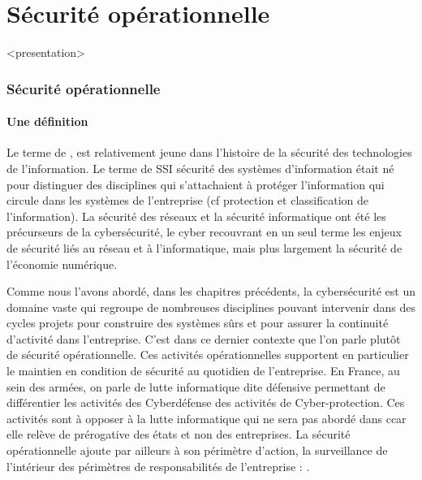 

\section{Sécurité opérationnelle}


\begin{frame}
<presentation>\frametitle{Sécurité opérationnelle}
\framesubtitle{Une définition}
Le terme de , est relativement jeune dans l’histoire de la sécurité des technologies de l’information. Le terme de SSI sécurité des systèmes d’information était né pour distinguer des disciplines qui s’attachaient à protéger l’information qui circule dans les systèmes de l’entreprise (cf protection et classification de l’information). La sécurité des réseaux et la sécurité informatique ont été les précurseurs de la cybersécurité, le cyber recouvrant en un seul terme les enjeux de sécurité liés au réseau et à l’informatique, mais plus largement la sécurité de l'économie numérique.
\end{frame}

Comme nous l’avons abordé, dans les chapitres précédents, la cybersécurité est un domaine vaste qui regroupe de nombreuses disciplines pouvant intervenir dans des cycles projets pour construire des systèmes sûrs et pour assurer la continuité d’activité dans l'entreprise.
C’est dans ce dernier contexte que l’on parle plutôt de sécurité opérationnelle. Ces activités opérationnelles supportent en particulier le maintien en condition de sécurité au quotidien de l’entreprise. En France, au sein des armées, on parle de lutte informatique dite défensive permettant de différentier les activités des Cyberdéfense des activités de Cyber-protection. Ces activités sont à opposer à la lutte informatique qui ne sera pas abordé dans c\ecours car elle relève de prérogative des états et non des entreprises.
La sécurité opérationnelle ajoute par ailleurs à son périmètre d'action,  la surveillance de l'intérieur des périmètres de responsabilités de l'entreprise :  .

